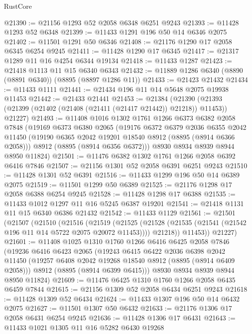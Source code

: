 \begin{lexlean}{RustCore}
\begin{coremodule}
@21390 := @21156 @1293 @52 @2058 @6348 @6251 @9243
@21393 := @11428 @1293 @52 @6348
@21399 := @11433 @1291 @196 @50 @14 @6346 @2075
@21402 := @11501 @1291 @50 @6346
@21408 := @21176 @1290 @17 @2058 @6345 @6254 @9245
@21411 := @11428 @1290 @17 @6345
@21417 := @21317 @1289 @11 @16 @4254 @6344 @19134
@21418 := @11433 @1287
@21423 := @21418 @1113 @11 @15 @6340 @6343
@21432 := @11889 @1286 @6340 (@8890 (@8891 @6340)) (@8895 (@8897 @1286 @11))
@21433 := @21423 @21432
@21434 := @11433 @1111
@21441 := @21434 @196 @11 @14 @5648 @2075 @19938 @11453
@21442 := @21433 @21441
@21453 := @21384
    (@21390 (@21393 (@21399 (@21402 (@21408 (@21411 (@21417 @21442)) @21218)) @11453)) @21227)
@21493 := @11408
    @1016
    @1302
    @1761
    @1266
    @6373
    @6382
    @2058
    @7848
    (@19169
      @6373
      @6380
      @2065
      (@19176
        @6372
        @6379
        @2036
        @6355
        @2042
        @11450
        (@19190 @6365 @2042 @19201 @18540 @8912 (@8895 (@8914 @6366 @2058)))
        @8912
        (@8895 (@8914 @6356 @6372)))
      @8930
      @8934
      @8939
      @8944
      @8950
      @11824)
@21501 := @11476 @6382 @1302 @1761 @1266 @2058 @6392 @6416 @7846
@21507 := @21156 @1301 @52 @2058 @6391 @6251 @9243
@21510 := @11428 @1301 @52 @6391
@21516 := @11433 @1299 @196 @50 @14 @6389 @2075
@21519 := @11501 @1299 @50 @6389
@21525 := @21176 @1298 @17 @2058 @6388 @6254 @9245
@21528 := @11428 @1298 @17 @6388
@21535 := @11433 @1012 @1297 @11 @16 @5245 @6387 @19201
@21541 := @21418 @1131 @11 @15 @6340 @6386 @21432
@21542 := @11433 @1129
@21561 := @21501
    (@21507
      (@21510
        (@21516
          (@21519
            (@21525
              (@21528 (@21535 (@21541 (@21542 @196 @11 @14 @5722 @2075 @20072 @11453))))
              @21218))
          @11453))
      @21227)
@21601 := @11408
    @1025
    @1310
    @1760
    @1266
    @6416
    @6425
    @2058
    @7846
    (@19236
      @6416
      @6423
      @2065
      (@19243
        @6415
        @6422
        @2036
        @6398
        @2042
        @11450
        (@19257 @6408 @2042 @19268 @18540 @8912 (@8895 (@8914 @6409 @2058)))
        @8912
        (@8895 (@8914 @6399 @6415)))
      @8930
      @8934
      @8939
      @8944
      @8950
      @11824)
@21609 := @11476 @6425 @1310 @1760 @1266 @2058 @6435 @6459 @7844
@21615 := @21156 @1309 @52 @2058 @6434 @6251 @9243
@21618 := @11428 @1309 @52 @6434
@21624 := @11433 @1307 @196 @50 @14 @6432 @2075
@21627 := @11501 @1307 @50 @6432
@21633 := @21176 @1306 @17 @2058 @6431 @6254 @9245
@21636 := @11428 @1306 @17 @6431
@21643 := @11433 @1021 @1305 @11 @16 @5282 @6430 @19268

\end{coremodule}
\end{lexlean}
